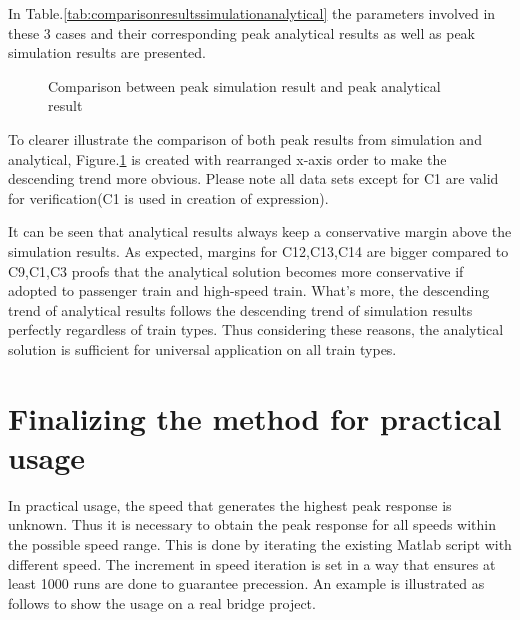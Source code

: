 In Table.\ref{tab:comparisonresultssimulationanalytical} the parameters involved in these 3 cases and their corresponding peak analytical results as well as peak simulation results are presented. 



\begin{figure}[h!]
\centering
{}
\caption{Comparison between peak simulation result and peak analytical result}
\label{fig:comparisonpeaksimulationanalytical}
\end{figure}

To clearer illustrate the comparison of both peak results from simulation and analytical, Figure.\ref{fig:comparisonpeaksimulationanalytical} is created with rearranged x-axis order to make the descending trend more obvious. Please note all data sets except for C1 are valid for verification(C1 is used in creation of expression).

It can be seen that analytical results always keep a conservative margin above the simulation results. As expected, margins for C12,C13,C14 are bigger compared to C9,C1,C3 proofs that the analytical solution becomes more conservative if adopted to passenger train and high-speed train. What's more, the descending trend of analytical results follows the descending trend of simulation results perfectly regardless of train types. Thus considering these reasons, the analytical solution is sufficient for universal application on all train types.

\section{Finalizing the method for practical usage}

In practical usage, the speed that generates the highest peak response is unknown. Thus it is necessary to obtain the peak response for all speeds within the possible speed range. This is done by iterating the existing Matlab script with different speed. The increment in speed iteration is set in a way that ensures at least 1000 runs are done to guarantee precession. An example is illustrated as follows to show the usage on a real bridge project.

